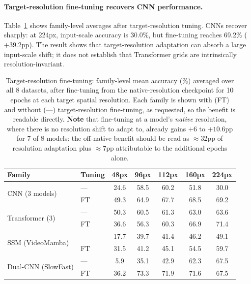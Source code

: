 \documentclass[runningheads]{llncs}
\newcommand{\tabtight}{\setlength{\tabcolsep}{3.5pt}\renewcommand{\arraystretch}{1.10}}
\newcommand{\rev}[1]{\textcolor{revblue}{#1}}
\begin{document}
\paragraph{Target-resolution fine-tuning recovers CNN performance.}
Table~\ref{tab:p3} shows family-level averages after target-resolution tuning. CNNs recover sharply: at 224px, input-scale accuracy is 30.0\%, but fine-tuning reaches 69.2\% ($+39.2$pp). \rev{The result shows that target-resolution adaptation can absorb a large input-scale shift; it does not establish that Transformer grids are intrinsically resolution-invariant.}

\begin{table}[t]
\centering
\caption{Target-resolution fine-tuning: family-level mean accuracy (\%) averaged over all 8 datasets, after fine-tuning from the native-resolution checkpoint for 10 epochs at each target spatial resolution. \rev{Each family is shown with (FT) and without (---) target-resolution fine-tuning, as requested, so the benefit is readable directly. \textbf{Note} that fine-tuning at a model's \emph{native} resolution, where there is no resolution shift to adapt to, already gains $+6$ to $+10.6$pp for 7 of 8 models: the off-native benefit should be read as $\approx$32pp of resolution adaptation plus $\approx$7pp attributable to the additional epochs alone.}}
\label{tab:p3}
\scriptsize\tabtight
\begin{tabular}{l l ccccc}
\toprule
Family & \rev{Tuning} & 48px & 96px & 112px & 160px & 224px \\
\midrule
\multirow{2}{*}{CNN (3 models)} & \rev{---}   & \rev{24.6} & \rev{58.5} & \rev{60.2} & \rev{51.8} & \rev{30.0} \\
                                & \rev{FT}    & 49.3 & 64.9 & 67.7 & 68.5 & 69.2 \\
\midrule
\multirow{2}{*}{Transformer (3)} & \rev{---}  & \rev{50.3} & \rev{60.5} & \rev{61.3} & \rev{63.0} & \rev{63.6} \\
                                 & \rev{FT}   & 36.6 & 56.3 & 60.3 & 66.9 & 71.4 \\
\midrule
\multirow{2}{*}{SSM (VideoMamba)} & \rev{---} & \rev{17.7} & \rev{39.7} & \rev{41.4} & \rev{46.2} & \rev{49.1} \\
                                  & \rev{FT}  & 31.5 & 41.2 & 45.1 & 54.5 & 59.7 \\
\midrule
\multirow{2}{*}{Dual-CNN (SlowFast)} & \rev{---} & \rev{5.9} & \rev{35.1} & \rev{42.9} & \rev{62.3} & \rev{67.5} \\
                                     & \rev{FT}  & 36.2 & 73.3 & 71.9 & 71.6 & 67.5 \\
\bottomrule
\end{tabular}
\end{table}
\end{document}
